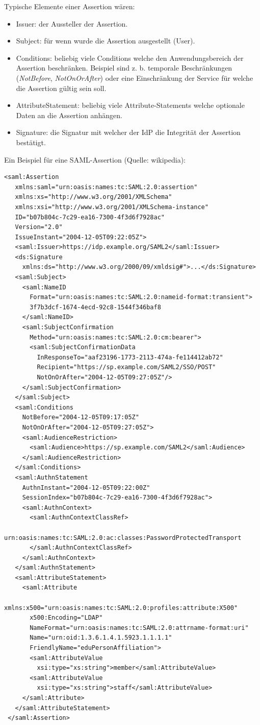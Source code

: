 Typische Elemente einer Assertion wären:

\begin{itemize}
	\item Issuer: der Aussteller der Assertion.
	\item Subject: für wenn wurde die Assertion ausgestellt (User).
	\item Conditions: beliebig viele Conditions welche den Anwendungsbereich der Assertion beschränken. Beispiel sind z. b. temporale Beschränkungen (\textit{NotBefore}, \textit{NotOnOrAfter}) oder eine Einschränkung der Service für welche die Assertion gültig sein soll.
	\item AttributeStatement: beliebig viele Attribute-Statements welche optionale Daten an die Assertion anhängen.
	\item Signature: die Signatur mit welcher der IdP die Integrität der Assertion bestätigt.
\end{itemize}

Ein Beispiel für eine SAML-Assertion (Quelle: wikipedia):

\begin{verbatim}
<saml:Assertion
   xmlns:saml="urn:oasis:names:tc:SAML:2.0:assertion"
   xmlns:xs="http://www.w3.org/2001/XMLSchema"
   xmlns:xsi="http://www.w3.org/2001/XMLSchema-instance"
   ID="b07b804c-7c29-ea16-7300-4f3d6f7928ac"
   Version="2.0"
   IssueInstant="2004-12-05T09:22:05Z">
   <saml:Issuer>https://idp.example.org/SAML2</saml:Issuer>
   <ds:Signature
     xmlns:ds="http://www.w3.org/2000/09/xmldsig#">...</ds:Signature>
   <saml:Subject>
     <saml:NameID
       Format="urn:oasis:names:tc:SAML:2.0:nameid-format:transient">
       3f7b3dcf-1674-4ecd-92c8-1544f346baf8
     </saml:NameID>
     <saml:SubjectConfirmation
       Method="urn:oasis:names:tc:SAML:2.0:cm:bearer">
       <saml:SubjectConfirmationData
         InResponseTo="aaf23196-1773-2113-474a-fe114412ab72"
         Recipient="https://sp.example.com/SAML2/SSO/POST"
         NotOnOrAfter="2004-12-05T09:27:05Z"/>
     </saml:SubjectConfirmation>
   </saml:Subject>
   <saml:Conditions
     NotBefore="2004-12-05T09:17:05Z"
     NotOnOrAfter="2004-12-05T09:27:05Z">
     <saml:AudienceRestriction>
       <saml:Audience>https://sp.example.com/SAML2</saml:Audience>
     </saml:AudienceRestriction>
   </saml:Conditions>
   <saml:AuthnStatement
     AuthnInstant="2004-12-05T09:22:00Z"
     SessionIndex="b07b804c-7c29-ea16-7300-4f3d6f7928ac">
     <saml:AuthnContext>
       <saml:AuthnContextClassRef>
         urn:oasis:names:tc:SAML:2.0:ac:classes:PasswordProtectedTransport
       </saml:AuthnContextClassRef>
     </saml:AuthnContext>
   </saml:AuthnStatement>
   <saml:AttributeStatement>
     <saml:Attribute
       xmlns:x500="urn:oasis:names:tc:SAML:2.0:profiles:attribute:X500"
       x500:Encoding="LDAP"
       NameFormat="urn:oasis:names:tc:SAML:2.0:attrname-format:uri"
       Name="urn:oid:1.3.6.1.4.1.5923.1.1.1.1"
       FriendlyName="eduPersonAffiliation">
       <saml:AttributeValue
         xsi:type="xs:string">member</saml:AttributeValue>
       <saml:AttributeValue
         xsi:type="xs:string">staff</saml:AttributeValue>
     </saml:Attribute>
   </saml:AttributeStatement>
 </saml:Assertion>
\end{verbatim}

